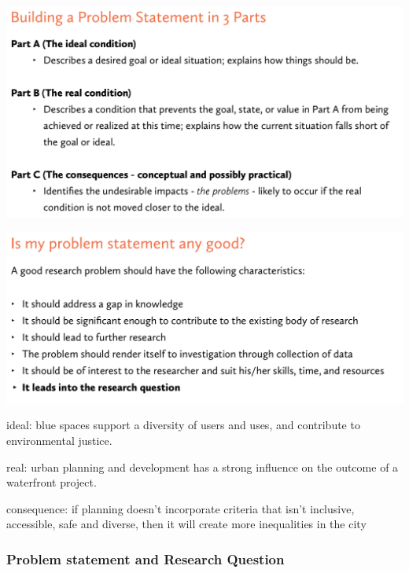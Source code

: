 \documentclass{article}
\begin{document}
\includegraphics[width=\textwidth]{problem_statement1}

\includegraphics[width=\textwidth]{problem_statement2}

\pagebreak

ideal: blue spaces support a diversity of users and uses, and contribute to environmental justice.

real: urban planning and development has a strong influence on the outcome of a waterfront project. 

consequence: if planning doesn't incorporate criteria that isn't inclusive, accessible, safe and diverse, then it will create more inequalities in the city

\subsubsection{Problem statement and Research Question}
\end{document}
